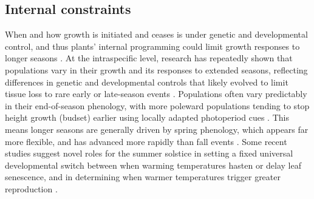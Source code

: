 \documentclass[11pt]{article}
\begin{document}
\subsection*{Internal constraints}
When and how growth is initiated and ceases is under genetic and developmental control, and thus plants' internal programming could limit growth responses to longer seasons \citep{howe2003genotype}. At the intraspecific level, research has repeatedly shown that populations vary in their growth and its responses to extended seasons, reflecting differences in genetic and developmental controls that likely evolved to limit tissue loss to rare early or late-season events \citep{mitton2012mountain,lange2006thresholds,cleland2024effects}. Populations often vary predictably in their end-of-season phenology, with more poleward populations tending to stop height growth (budset) earlier using locally adapted photoperiod cues \citep{soolanayakanahally2013timing,aitken2016}. This means longer seasons are generally driven by spring phenology, which appears far more flexible, and has advanced more rapidly than fall events \citep{aitken2016}. Some recent studies suggest novel roles for the summer solstice \citep{zohner2023effect} in setting a fixed universal developmental switch between when warming temperatures hasten or delay leaf senescence, and in determining when warmer temperatures trigger greater reproduction \citep{Journe2024}. %
\end{document}

